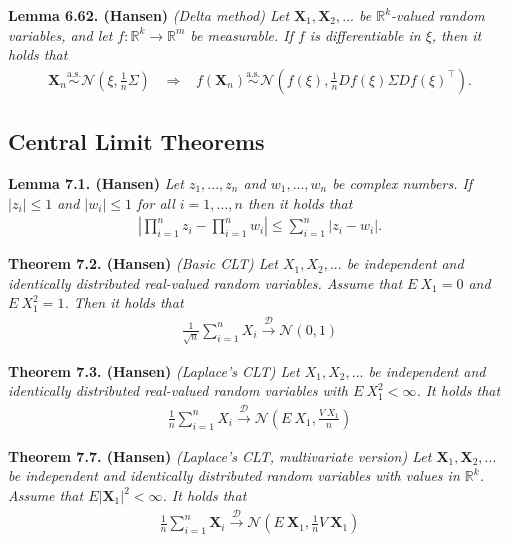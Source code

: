 \documentclass[a4paper,10pt,openany]{book}
\begin{document}
\textbf{Lemma 6.62. (Hansen)} \emph{(Delta method) Let \(\mathbf{X}_1,\mathbf{X}_2,...\) be \(\mathbb{R}^k\)-valued random variables, and let \(f : \mathbb{R}^k\to \mathbb{R}^m\) be measurable. If \(f\) is differentiable in \(\xi\), then it holds that}
\begin{align*}
    \mathbf{X}_n\stackrel{\text{a.s.}}{\sim} \mathcal{N}\left(\xi,\frac{1}{n}\Sigma\right)\hspace{10pt}\Rightarrow\hspace{10pt} f(\mathbf{X}_n)\stackrel{\text{a.s.}}{\sim} \mathcal{N}\left(f(\xi),\frac{1}{n}Df(\xi)\Sigma Df(\xi)^\top\right).
\end{align*}

\hypertarget{central-limit-theorems}{%
\subsection{Central Limit Theorems}\label{central-limit-theorems}}

\textbf{Lemma 7.1. (Hansen)} \emph{Let \(z_1,...,z_n\) and \(w_1,...,w_n\) be complex numbers. If \(\vert z_i\vert \le 1\) and \(\vert w_i\vert\le 1\) for all \(i=1,...,n\) then it holds that}
\begin{align*}
    \left\vert\prod_{i=1}^n z_i-\prod_{i=1}^n w_i\right\vert\le \sum_{i=1}^n \vert z_i-w_i\vert.\tag{7.1 }
\end{align*}

\textbf{Theorem 7.2. (Hansen)} \emph{(Basic CLT) Let \(X_1,X_2,...\) be independent and identically distributed real-valued random variables. Assume that \(E\ X_1=0\) and \(E\ X_1^2=1\). Then it holds that}
\begin{align*}
    \frac{1}{\sqrt{n}}\sum_{i=1}^nX_i\stackrel{\mathcal{D}}{\to} \mathcal{N}(0,1)\tag{7.3}
\end{align*}

\textbf{Theorem 7.3. (Hansen)} \emph{(Laplace's CLT) Let \(X_1,X_2,...\) be independent and identically distributed real-valued random variables with \(E\ X_1^2<\infty\). It holds that}
\begin{align*}
    \frac{1}{n}\sum_{i=1}^nX_i\stackrel{\mathcal{D}}{\to} \mathcal{N}\left(E\ X_1,\frac{V\ X_1}{n}\right)\tag{7.4}
\end{align*}

\textbf{Theorem 7.7. (Hansen)} \emph{(Laplace's CLT, multivariate version) Let \(\mathbf{X}_1,\mathbf{X}_2,...\) be independent and identically distributed random variables with values in \(\mathbb{R}^k\). Assume that \(E\vert \mathbf{X}_1\vert^2<\infty\). It holds that}
\begin{align*}
    \frac{1}{n}\sum_{i=1}^n\mathbf{X}_i\stackrel{\mathcal{D}}{\to} \mathcal{N}\left(E\ \mathbf{X}_1,\frac{1}{n}V\ \mathbf{X}_1\right)\tag{7.7}
\end{align*}
\end{document}

